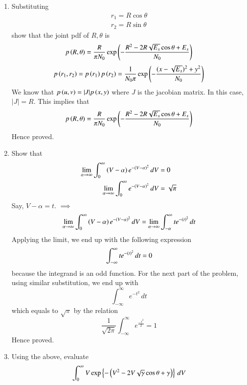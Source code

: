 \documentclass[journal,12pt,twocolumn]{IEEEtran}
\begin{document}
\begin{problem}
\begin{enumerate}
\item Substituting 
\begin{align}
r_1=R\cos \theta \\
r_2=R\sin \theta
\end{align}
show that the joint pdf of $R,\theta$ is
%
\begin{equation}
p\left(R,\theta\right)=\frac{R}{\pi N_0}\exp\left(-\frac{R^2-2R\sqrt{E_s}\cos \theta + E_s}{N_0}\right)
\end{equation}
\solution
\begin{equation}
p\left(r_1,r_2\right)=p\left(r_1\right)p\left(r_2\right)=\frac{1}{N_0\pi}\exp\left(-\frac{(x-\sqrt{E_s})^2+y^2}{N_0}\right)
\end{equation}
We know that $p\left(u,v\right)=|J|p\left(x,y\right)$ where $J$ is the jacobian matrix. In this case, $|J|=R$.
This implies that
\begin{equation}
p\left(R,\theta\right)=\frac{R}{\pi N_0}\exp\left(-\frac{R^2-2R\sqrt{E_s}\cos \theta + E_s}{N_0}\right)
\end{equation}
Hence proved.
%
\item Show that 
%
\begin{align}
\lim_{\alpha \rightarrow \infty}\int_{0}^{\infty}\left(V-\alpha \right)e^{-\left(V-\alpha\right)^2 }\,dV
&= 0
\\
\lim_{\alpha \rightarrow \infty}\int_{0}^{\infty} e^{-\left(V-\alpha\right)^2 }\,dV
&=  \sqrt{\pi}
\end{align}
%
\solution
Say, $V-\alpha=t$.
$\implies$
\begin{equation}
\lim_{\alpha \rightarrow \infty}\int_{0}^{\infty}\left(V-\alpha \right)e^{-\left(V-\alpha\right)^2 }\,dV=\lim_{\alpha \rightarrow \infty}\int_{-\alpha}^{\infty}te^{-\left(t\right)^2 }\,dt
\end{equation}
Applying the limit, we end up with the following expression
\begin{equation}
\int_{-\infty}^{\infty}te^{-\left(t\right)^2 }\,dt=0
\end{equation}
because the integrand is an odd function.
For the next part of the problem, using similar substitution, we end up with 
\begin{equation}
\int_{-\infty}^{\infty}e^{-t^2 }\,dt
\end{equation}
which equals to $\sqrt{\pi}$ by the relation
\begin{equation}
\frac{1}{\sqrt{2\pi}}\int_{-\infty}^{\infty}e^{\frac{-t^2}{2}}=1
\end{equation}
Hence proved.
\item 
Using the above, evaluate
%
\begin{align}
\int_{0}^{\infty}V\exp\left\{-\left(V^2 - 2V \sqrt{\gamma}\cos \theta +\gamma\right)\right\}\,dV
\end{align}


\end{enumerate}
\end{problem}
\end{document}
